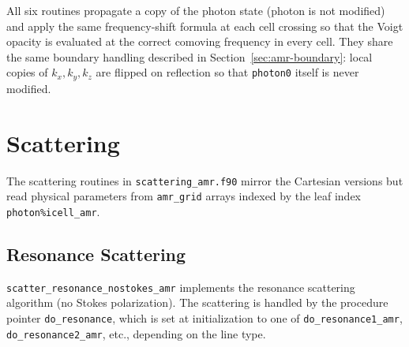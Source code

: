 \documentclass[english,a4paper]{my_memo}
\begin{document}
All six routines propagate a copy of the photon state (photon is not modified)
and apply the same frequency-shift formula at each cell crossing so that the
Voigt opacity is evaluated at the correct comoving frequency in every cell.
They share the same boundary handling described in
Section~\ref{sec:amr-boundary}: local copies of $k_x, k_y, k_z$ are
flipped on reflection so that \texttt{photon0} itself is never
modified.

\section{Scattering}

The scattering routines in \texttt{scattering\_amr.f90} mirror the Cartesian
versions but read physical parameters from \texttt{amr\_grid} arrays indexed
by the leaf index \texttt{photon\%icell\_amr}.

\subsection{Resonance Scattering}

\begin{sloppypar}
\texttt{scatter\_resonance\_nostokes\_amr} implements the resonance scattering
algorithm (no Stokes polarization).  The scattering is handled by the procedure
pointer \texttt{do\_resonance}, which is set at initialization to one of
\texttt{do\_resonance1\_amr}, \texttt{do\_resonance2\_amr}, etc., depending on
the line type.
\end{sloppypar}
\end{document}
